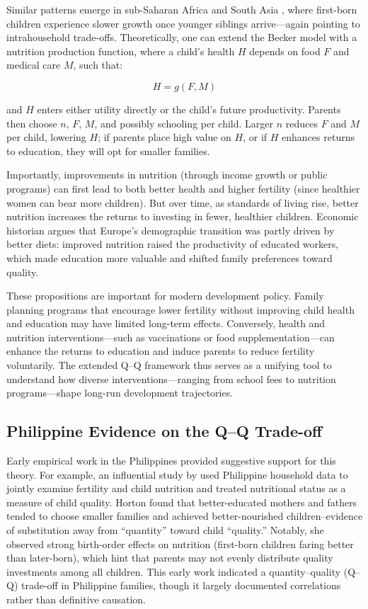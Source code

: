 \documentclass[]{AEA}
\begin{document}
Similar patterns emerge in sub-Saharan Africa
\citep{bishwakarma2019first} and South Asia , where first-born children
experience slower growth once younger siblings arrive---again pointing
to intrahousehold trade-offs. Theoretically, one can extend the Becker
model with a nutrition production function, where a child's health \(H\)
depends on food \(F\) and medical care \(M\), such that:

\[
H = g(F, M)
\]

and \(H\) enters either utility directly or the child's future
productivity. Parents then choose \(n\), \(F\), \(M\), and possibly
schooling per child. Larger \(n\) reduces \(F\) and \(M\) per child,
lowering \(H\); if parents place high value on \(H\), or if \(H\)
enhances returns to education, they will opt for smaller families.

Importantly, improvements in nutrition (through income growth or public
programs) can first lead to both better health and higher fertility
(since healthier women can bear more children). But over time, as
standards of living rise, better nutrition increases the returns to
investing in fewer, healthier children. Economic historian
\citet{fogel1994economic} argues that Europe's demographic transition
was partly driven by better diets: improved nutrition raised the
productivity of educated workers, which made education more valuable and
shifted family preferences toward quality.

These propositions are important for modern development policy. Family
planning programs that encourage lower fertility without improving child
health and education may have limited long-term effects. Conversely,
health and nutrition interventions---such as vaccinations or food
supplementation---can enhance the returns to education and induce
parents to reduce fertility voluntarily. The extended Q--Q framework
thus serves as a unifying tool to understand how diverse
interventions---ranging from school fees to nutrition programs---shape
long-run development trajectories.

\subsection{Philippine Evidence on the Q–Q Trade-off}

Early empirical work in the Philippines provided suggestive support for
this theory. For example, an influential study by
\citet{horton1986child} used Philippine household data to jointly
examine fertility and child nutrition and treated nutritional status as
a measure of child quality. Horton found that better-educated mothers
and fathers tended to choose smaller families and achieved
better-nourished children--evidence of substitution away from
``quantity'' toward child ``quality.'' Notably, she observed strong
birth-order effects on nutrition (first-born children faring better than
later-born), which hint that parents may not evenly distribute quality
investments among all children. This early work indicated a
quantity--quality (Q--Q) trade-off in Philippine families, though it
largely documented correlations rather than definitive causation.
\end{document}
